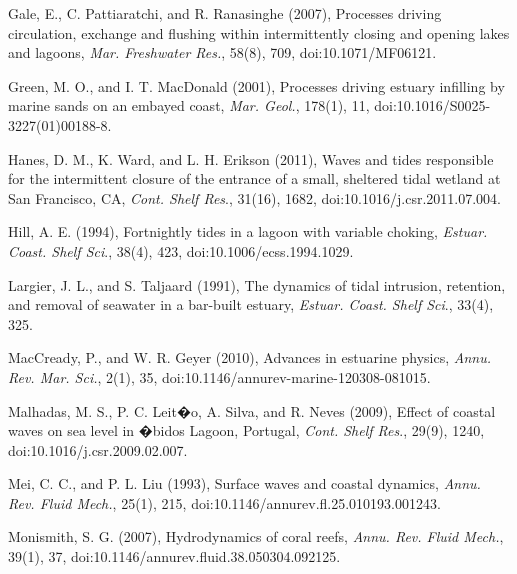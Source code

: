 \begin{thebibliography}{\textit{Ranasinghe and Patttiaratchi}(2003)}
Gale, E., C.
Pattiaratchi, and R. Ranasinghe (2007), Processes driving circulation,
exchange and flushing within intermittently closing and opening lakes
and lagoons, \emph{Mar. Freshwater Res.}, 58(8), 709, doi:10.1071/MF06121. 

Green,
M. O., and I. T. MacDonald (2001), Processes driving estuary infilling
by marine sands on an embayed coast, \emph{Mar. Geol.}, 178(1),
11, doi:10.1016/S0025-3227(01)00188-8. 

Hanes, D. M.,
K. Ward, and L. H. Erikson (2011), Waves and tides responsible for
the intermittent closure of the entrance of a small, sheltered tidal
wetland at San Francisco, CA, \emph{Cont. Shelf Res}., 31(16), 1682,
doi:10.1016/j.csr.2011.07.004. 

Hill, A. E. (1994), Fortnightly
tides in a lagoon with variable choking, \emph{Estuar. Coast. Shelf
Sci}., 38(4), 423, doi:10.1006/ecss.1994.1029. 

Largier,
J. L., and S. Taljaard (1991), The dynamics of tidal intrusion, retention,
and removal of seawater in a bar-built estuary, \emph{Estuar. Coast.
Shelf Sci}., 33(4), 325.

MacCready,
P., and W. R. Geyer (2010), Advances in estuarine physics, \emph{Annu.
Rev. Mar. Sci.}, 2(1), 35, doi:10.1146/annurev-marine-120308-081015.

Malhadas,
M. S., P. C. Leit�o, A. Silva, and R. Neves (2009), Effect of coastal
waves on sea level in �bidos Lagoon, Portugal, \emph{Cont. Shelf Res}.,
29(9), 1240, doi:10.1016/j.csr.2009.02.007.

Mei, C. C., and
P. L. Liu (1993), Surface waves and coastal dynamics, \emph{Annu.
Rev. Fluid Mech.}, 25(1), 215, doi:10.1146/annurev.fl.25.010193.001243. 

Monismith, S. G.
(2007), Hydrodynamics of coral reefs, \emph{Annu. Rev. Fluid Mech.},
39(1), 37, doi:10.1146/annurev.fluid.38.050304.092125. 


\end{thebibliography}
